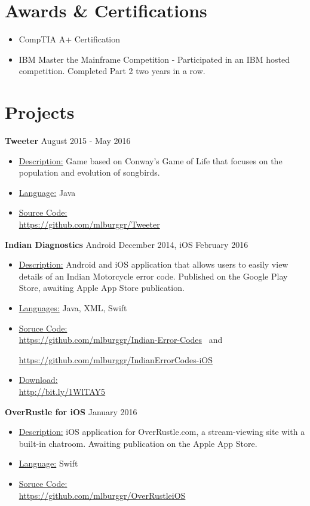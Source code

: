 \documentclass[margin]{res}
\begin{document}
\begin{resume}
\section{Awards \& Certifications}
\begin{itemize}
\item CompTIA A+ Certification
\item IBM Master the Mainframe Competition - Participated in an IBM hosted competition. Completed Part 2 two years in a row.
\end{itemize}

\section{Projects}

{\bf Tweeter} \hfill August 2015 - May 2016
\begin{itemize}
 \item \underline{Description:} Game based on Conway’s Game of Life that focuses on the population and evolution of songbirds.
 \item \underline{Language:} Java\
 \item \underline{Source Code:} \\ \url{https://github.com/mlburggr/Tweeter} \
\end{itemize}
{\bf Indian Diagnostics} \hfill Android December 2014, iOS February 2016
\begin{itemize}   
 \item \underline{Description:} Android and iOS application that allows users to easily view details of an Indian Motorcycle error code. Published on the Google Play Store, awaiting Apple App Store publication.\
 \item \underline{Languages:} Java, XML, Swift\
 \item \underline{Soruce Code:} \\ \url{https://github.com/mlburggr/Indian-Error-Codes}      \ 
 and 

  \url{https://github.com/mlburggr/IndianErrorCodes-iOS}\
  
 \item \underline{Download:} \\ \url{http://bit.ly/1WlTAY5}
\end{itemize}

{\bf OverRustle for iOS} \hfill January 2016
\begin{itemize}
 \item \underline{Description:} iOS application for OverRustle.com, a stream-viewing site with a built-in chatroom. Awaiting publication on the Apple App Store.\
 \item \underline{Language:} Swift
 \item \underline{Soruce Code:} \\
 \url{https://github.com/mlburggr/OverRustleiOS}\
\end{itemize}



\end{resume}
\end{document}
